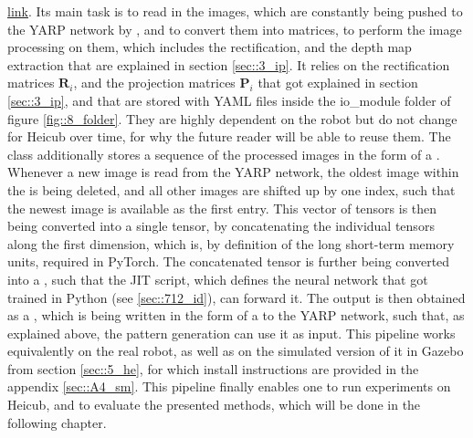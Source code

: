 \href{https://github.com/mhubii/nmpc_pattern_generator/blob/719fde0bb73925923de85cbf379c5523e075dfeb/src/behavioural_augmentation_real_robot_external_data.cpp#L108}{\underline{link}}. Its main task is to read in the images, which are constantly being pushed to the YARP network by , and to convert them into  matrices, to perform the image processing on them, which includes the rectification, and the depth map extraction that are explained in section \ref{sec::3_ip}. It relies on the rectification matrices $\bm{R}_i$, and the projection matrices $\bm{P}_i$ that got explained in section \ref{sec::3_ip}, and that are stored with YAML files inside the io\_module folder of figure \ref{fig::8_folder}. They are highly dependent on the robot but do not change for Heicub over time, for why the future reader will be able to reuse them. The  class additionally stores a sequence of the processed images in the form of a . Whenever a new image is read from the YARP network, the oldest image within the  is being deleted, and all other images are shifted up by one index, such that the newest image is available as the first entry. This vector of tensors is then being converted into a single tensor, by concatenating the individual tensors along the first dimension, which is, by definition of the long short-term memory units, required in PyTorch. The concatenated tensor is further being converted into a , such that the JIT script, which defines the neural network that got trained in Python (see \ref{sec::712_id}), can forward it. The output is then obtained as a , which is being written in the form of a  to the YARP network, such that,  as explained above, the pattern generation can use it as input. This pipeline works equivalently on the real robot, as well as on the simulated version of it in Gazebo from section \ref{sec::5_he}, for which install instructions are provided in the appendix \ref{sec::A4_sm}. This pipeline finally enables one to run experiments on Heicub, and to evaluate the presented methods, which will be done in the following chapter.